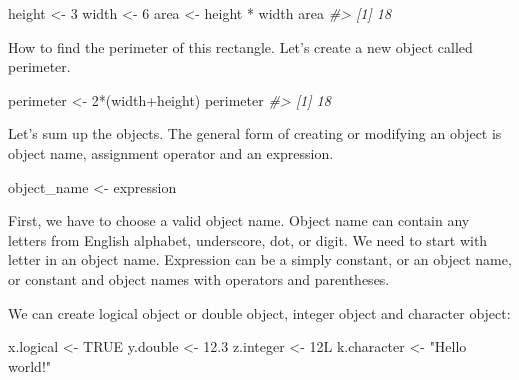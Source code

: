 \documentclass[
]{book}
\newenvironment{Shaded}{\begin{snugshade}}{\end{snugshade}}
\newcommand{\CommentTok}[1]{\textcolor[rgb]{0.56,0.35,0.01}{\textit{#1}}}
\newcommand{\ConstantTok}[1]{\textcolor[rgb]{0.00,0.00,0.00}{#1}}
\newcommand{\DecValTok}[1]{\textcolor[rgb]{0.00,0.00,0.81}{#1}}
\newcommand{\FloatTok}[1]{\textcolor[rgb]{0.00,0.00,0.81}{#1}}
\newcommand{\NormalTok}[1]{#1}
\newcommand{\OtherTok}[1]{\textcolor[rgb]{0.56,0.35,0.01}{#1}}
\newcommand{\SpecialCharTok}[1]{\textcolor[rgb]{0.00,0.00,0.00}{#1}}
\newcommand{\StringTok}[1]{\textcolor[rgb]{0.31,0.60,0.02}{#1}}
\begin{document}
\begin{Shaded}
\begin{Highlighting}[]
\NormalTok{height }\OtherTok{\textless{}{-}} \DecValTok{3}
\NormalTok{width }\OtherTok{\textless{}{-}} \DecValTok{6}
\NormalTok{area }\OtherTok{\textless{}{-}}\NormalTok{ height }\SpecialCharTok{*}\NormalTok{ width}
\NormalTok{area }
\CommentTok{\#\textgreater{} [1] 18}
\end{Highlighting}
\end{Shaded}

How to find the perimeter of this rectangle. Let's create a new object called perimeter.

\begin{Shaded}
\begin{Highlighting}[]
\NormalTok{perimeter }\OtherTok{\textless{}{-}} \DecValTok{2}\SpecialCharTok{*}\NormalTok{(width}\SpecialCharTok{+}\NormalTok{height)}
\NormalTok{perimeter}
\CommentTok{\#\textgreater{} [1] 18}
\end{Highlighting}
\end{Shaded}

Let's sum up the objects. The general form of creating or modifying an object is object name, assignment operator and an expression.

\begin{Shaded}
\begin{Highlighting}[]
\NormalTok{object\_name }\OtherTok{\textless{}{-}}\NormalTok{ expression}
\end{Highlighting}
\end{Shaded}

First, we have to choose a valid object name. Object name can contain any letters from English alphabet, underscore, dot, or digit. We need to start with letter in an object name. Expression can be a simply constant, or an object name, or constant and object names with operators and parentheses.

We can create logical object or double object, integer object and character object:

\begin{Shaded}
\begin{Highlighting}[]
\NormalTok{x.logical }\OtherTok{\textless{}{-}} \ConstantTok{TRUE}
\NormalTok{y.double }\OtherTok{\textless{}{-}} \FloatTok{12.3}
\NormalTok{z.integer }\OtherTok{\textless{}{-}}\NormalTok{ 12L}
\NormalTok{k.character }\OtherTok{\textless{}{-}} \StringTok{"Hello world!"}
\end{Highlighting}
\end{Shaded}
\end{document}
